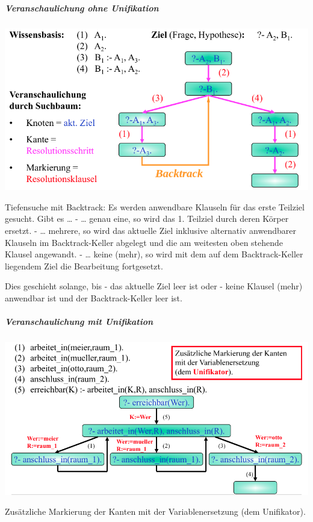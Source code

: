 \documentclass[a4paper]{article}
\begin{document}
\begin{multicols}{3}
  \subparagraph{Veranschaulichung ohne
    Unifikation}\label{veranschaulichung-ohne-unifikation}


  \includegraphics[width=\linewidth]{Assets/Logik-prolog-ohne-unifikation.png}

  Tiefensuche mit Backtrack: Es werden anwendbare Klauseln für das erste
  Teilziel gesucht. Gibt es \ldots{} - \ldots{} genau eine, so wird das 1.
  Teilziel durch deren Körper ersetzt. - \ldots{} mehrere, so wird das
  aktuelle Ziel inklusive alternativ anwendbarer Klauseln im
  Backtrack-Keller abgelegt und die am weitesten oben stehende Klausel
  angewandt. - \ldots{} keine (mehr), so wird mit dem auf dem
  Backtrack-Keller liegendem Ziel die Bearbeitung fortgesetzt.

  Dies geschieht solange, bis - das aktuelle Ziel leer ist oder - keine
  Klausel (mehr) anwendbar ist und der Backtrack-Keller leer ist.

  \subparagraph{Veranschaulichung mit
    Unifikation}\label{veranschaulichung-mit-unifikation}


  \includegraphics[width=\linewidth]{Assets/Logik-prolog-mit-unifikation.png}

  Zusätzliche Markierung der Kanten mit der Variablenersetzung (dem
  Unifikator).


\end{multicols}
\end{document}
